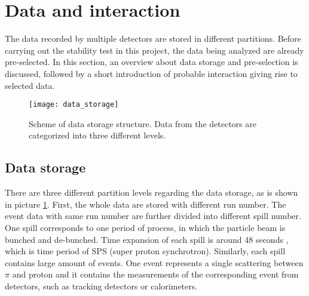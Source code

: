 

\section{Data and interaction}
The data recorded by multiple detectors are stored in different partitions. Before carrying out the stability test in this project, the data being analyzed are already pre-selected. In this section, an overview about data storage and pre-selection is discussed, followed by a short introduction of probable interaction giving rise to selected data.

\begin{figure}[t!]
	\centering
	\texttt{[image: data\_storage]}
	\caption{Scheme of data storage structure. Data from the detectors are categorized into three different levels.}
	\label{fig:data_storage}
\end{figure}

\subsection{Data storage}
There are three different partition levels regarding the data storage, as is shown in picture \ref{fig:data_storage}. First, the whole data are stored with different run number. The event data with same run number are further divided into different spill number. One spill corresponds to one period of process, in which the particle beam is bunched and de-bunched. Time expansion of each spill is around 48 seconds \cite{COMPASS}, which is time period of SPS (super proton synchrotron). Similarly, each spill contains large amount of events. One event represents a single scattering between $\pi$ and proton and it contains the measurements of the corresponding event from detectors, such as tracking detectors or calorimeters.

